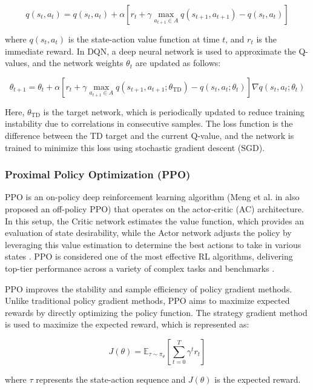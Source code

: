\documentclass[preprint,12pt]{elsarticle}
\begin{document}
\[
q(s_t, a_t) = q(s_t, a_t) + \alpha \left[ r_t + \gamma \max_{a_{t+1} \in A} q(s_{t+1}, a_{t+1}) - q(s_t, a_t) \right]
\]

where \(q(s_t, a_t)\) is the state-action value function at time \(t\), and \(r_t\) is the immediate reward. In DQN, a deep neural network is used to approximate the Q-values, and the network weights \(\theta_t\) are updated as follows:

\[
\theta_{t+1} = \theta_t + \alpha \left[ r_t + \gamma \max_{a_{t+1} \in A} q(s_{t+1}, a_{t+1}; \theta_{\text{TD}}) - q(s_t, a_t; \theta_t) \right] \nabla q(s_t, a_t; \theta_t)
\]

Here, \( \theta_{\text{TD}} \) is the target network, which is periodically updated to reduce training instability due to correlations in consecutive samples. The loss function is the difference between the TD target and the current Q-value, and the network is trained to minimize this loss using stochastic gradient descent (SGD).





\subsubsection{Proximal Policy Optimization (PPO)}

PPO is an on-policy deep reinforcement learning algorithm (Meng et al. in \cite{meng2023off} also proposed an off-policy PPO) that operates on the actor-critic (AC) architecture. In this setup, the Critic network estimates the value function, which provides an evaluation of state desirability, while the Actor network adjusts the policy by leveraging this value estimation to determine the best actions to take in various states \cite{gu2021proximal}. PPO is considered one of the most effective RL algorithms, delivering top-tier performance across a variety of complex tasks and benchmarks \cite{wang2020truly}. 


PPO improves the stability and sample efficiency of policy gradient methods. Unlike traditional policy gradient methods, PPO aims to maximize expected rewards by directly optimizing the policy function. The strategy gradient method is used to maximize the expected reward, which is represented as:

\[
J(\theta) = \mathbb{E}_{\tau \sim \pi_{\theta}} \left[ \sum_{t=0}^{T} \gamma^t r_t \right]
\]

where \(\tau\) represents the state-action sequence and \(J(\theta)\) is the expected reward.
\end{document}
